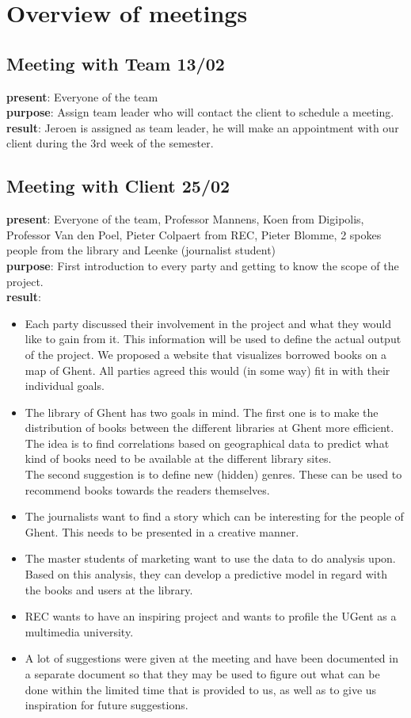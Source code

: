 \chapter{Overview of meetings}

\section{Meeting with Team 13/02}
{\bf present}: Everyone of the team\\
{\bf purpose}: Assign team leader who will contact the client to schedule a meeting.\\
{\bf result}: Jeroen is assigned as team leader, he will make an appointment with our client during the 3rd week of the semester. 

\section{Meeting with Client 25/02}

{\bf present}: Everyone of the team, Professor Mannens, Koen from Digipolis, Professor Van den Poel, Pieter Colpaert from REC, Pieter Blomme, 2 spokes people from the library and Leenke (journalist student)\\
{\bf purpose}: First introduction to every party and getting to know the scope of the project.\\
{\bf result}: 
\begin{itemize}
\item Each party discussed their involvement in the project and what they would like to gain from it. This information will be used to define the actual output of the project. We proposed a website that visualizes borrowed books on a map of Ghent. All parties agreed this would (in some way) fit in with their individual goals.
\item The library of Ghent has two goals in mind. The first one is to make the distribution of books between the different libraries at Ghent more efficient. The idea is to find correlations based on geographical data to predict what kind of books need to be available at the different library sites.\\ The second suggestion is to define new (hidden) genres. These can be used to recommend books towards the readers themselves.
\item The journalists want to find a story which can be interesting for the people of Ghent. This needs to be presented in a creative manner.
\item The master students of marketing want to use the data to do analysis upon. Based on this analysis, they can develop a predictive model in regard with the books and users at the library.
\item REC wants to have an inspiring project and wants to profile the UGent as a multimedia university.
\item A lot of suggestions were given at the meeting and have been documented in a separate document so that they may be used to figure out what can be done within the limited time that is provided to us, as well as to give us inspiration for future suggestions.
\end{itemize}
